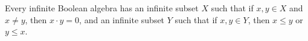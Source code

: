 Every infinite Boolean algebra has an infinite subset $X$ such that if $x, y \in X$ and $x \neq y$, then $x \cdot y = 0$, and an infinite subset $Y$ such that if $x, y \in Y$, then $x \leq y$ or $y \leq x$.
